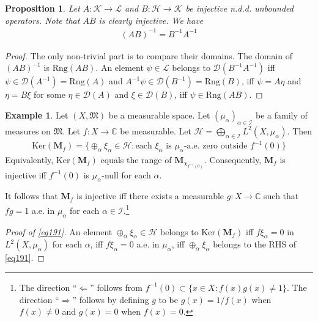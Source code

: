 \documentclass[12pt,b5paper,notitlepage]{article}
\theoremstyle{definition}
\newtheorem{eg}[df]{Example}
\theoremstyle{plain}
\newtheorem{pp}[df]{Proposition}
\newcommand{\fk}{\mathfrak}
\newcommand{\Dom}{\mathscr{D}}
\newcommand{\Cbb}{\mathbb C}
\newcommand{\Ker}{\mathrm{Ker}}
\newcommand{\Rng}{\mathrm{Rng}}
\newcommand{\MH}{\mathcal H}
\newcommand{\MK}{\mathcal K}
\newcommand{\ML}{\mathcal L}
\newcommand{\SI}{\mathscr I}
\newcommand{\Mbf}{\mathbf M}
\numberwithin{equation}{section}
\begin{document}
\begin{pp}
Let $A:\MK\rightarrow\ML$ and $B:\MH\rightarrow\MK$ be injective n.d.d. unbounded operators. Note that $AB$ is clearly injective. We have
\begin{align*}
(AB)^{-1}=B^{-1}A^{-1}
\end{align*}
\end{pp}

\begin{proof}
The only non-trivial part is to compare their domains. The domain of $(AB)^{-1}$ is $\Rng(AB)$. An element $\psi\in\ML$ belongs to $\Dom(B^{-1}A^{-1})$ iff $\psi\in\Dom(A^{-1})=\Rng(A)$ and $A^{-1}\psi\in\Dom(B^{-1})=\Rng(B)$, iff $\psi=A\eta$ and $\eta=B\xi$ for some $\eta\in\Dom(A)$ and $\xi\in\Dom(B)$, iff $\psi\in\Rng(AB)$.
\end{proof}







\begin{eg}\label{lb372}
Let $(X,\fk M)$ be a measurable space. Let $(\mu_\alpha)_{\alpha\in\SI}$ be a family of measures on $\fk M$. Let $f:X\rightarrow\Cbb$ be measurable. Let $\MH=\bigoplus_{\alpha\in\SI}L^2(X,\mu_\alpha)$. Then
\begin{align}\label{eq191}
\Ker(\Mbf_f)=\Big\{\oplus_\alpha\xi_\alpha\in\MH:\text{each }\xi_\alpha\text{ is }\mu_\alpha\text{-a.e. zero outside }f^{-1}(0) \Big\}
\end{align}
Equivalently, $\Ker(\Mbf_f)$ equals the range of $\Mbf_{\chi_{f^{-1}(0)}}$. Consequently, $\Mbf_f$ is injective iff $f^{-1}(0)$ is $\mu_\alpha$-null for each $\alpha$.
\end{eg}

It follows that $\Mbf_f$ is injective iff there exists a measurable $g:X\rightarrow\Cbb$ such that $fg=1$ a.e. in $\mu_\alpha$ for each $\alpha\in\SI$.\footnote{The direction ``$\Leftarrow$'' follows from $f^{-1}(0)\subset\{x\in X:f(x)g(x)\neq1\}$. The direction ``$\Rightarrow$'' follows by defining $g$ to be $g(x)=1/f(x)$ when $f(x)\neq0$ and $g(x)=0$ when $f(x)=0$.}


\begin{proof}[Proof of \eqref{eq191}]
An element $\oplus_\alpha\xi_\alpha\in\MH$ belongs to $\Ker(\Mbf_f)$ iff $f\xi_\alpha=0$ in $L^2(X,\mu_\alpha)$ for each $\alpha$, iff $f\xi_\alpha=0$ a.e. in $\mu_\alpha$, iff $\oplus_\alpha\xi_\alpha$ belongs to the RHS of \eqref{eq191}.
\end{proof}
\end{document}

